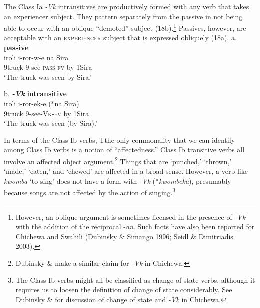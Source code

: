 \documentclass[output=paper]{langsci/langscibook}
\begin{document}
The Class Ia \textit{{}-Vk }intransitives are productively formed with any verb that takes an experiencer subject. They pattern separately from the passive in not being able to occur with an oblique “demoted” subject (18b).\footnote{ However, an oblique argument is sometimes licensed in the presence of \textit{{}-Vk} with the addition of the reciprocal -\textit{an}. Such facts have also been reported for Chichewa and Swahili (Dubinsky \& Simango 1996; Seidl \& Dimitriadis 2003).}\textsuperscript{ } Passives, however, are acceptable with an \textsc{experiencer} subject that is expressed obliquely (18a). 
\ea
{a. \textbf{passive}}\\
\gll iroli      i-ror-w-e         na Sira\\
     9truck  9-see-\textsc{pass-fv} by 1Sira\\
\glt ‘The truck was seen by Sira.’ 
\z

\ea
{b. \textbf{\textit{{}-Vk}}\textbf{ intransitive}}\\
\gll iroli    i-ror-ek-e       (*na Sira)\\
     9truck 9-see-\textsc{Vk}\textsc{{}-}\textsc{fv}   by 1Sira\\
\glt ‘The truck was seen (by Sira).’
\z

In terms of the Class Ib verbs, Tthe only commonality that we can identify among Class Ib verbs is a notion of “affectedness.” Class Ib transitive verbs all involve an affected object argument.\footnote{ Dubinsky \& \citet{Simango1996} make a similar claim for \textit{{}-Vk} in Chichewa.} Things that are ‘punched,’ ‘thrown,’ ‘made,’ ‘eaten,’ and ‘chewed’ are affected in a broad sense. However, a verb like \textit{kwomba} ‘to sing’ does not have a form with \textit{{}-Vk} (*\textit{kwombeka}), presumably because songs are not affected by the action of singing.\footnote{ The Class Ib verbs might all be classified as change of state verbs, although it requires us to loosen the definition of change of state considerably. See Dubinsky \& \citet{Simango1996} for discussion of change of state and \textit{{}-Vk} in Chichewa.}
\end{document}

